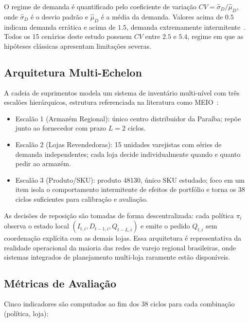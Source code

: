 \documentclass[a4paper,11pt]{article}
\begin{document}
O regime de demanda é quantificado pelo coeficiente de variação
$CV = \hat{\sigma}_D / \hat{\mu}_D$, onde $\hat{\sigma}_D$ é o
desvio padrão e $\hat{\mu}_D$ é a média da demanda. Valores acima
de \(0.5\) indicam demanda errática e acima de \(1.5\), demanda
extremamente intermitente~\citep{syntetos:2001}. Todos os 15
cenários deste estudo possuem $CV$ entre \(2.5\) e \(5.4\), regime
em que as hipóteses clássicas apresentam limitações severas.

\subsection{Arquitetura Multi-Echelon}

A cadeia de suprimentos modela um sistema de inventário multi-nível
com três escalões hierárquicos, estrutura referenciada na literatura
como MEIO~\citep{axsater:2006,clark:1960}:

\begin{itemize}
  \item Escalão 1 (Armazém Regional): único centro distribuidor da
    Paraíba; repõe junto ao fornecedor com prazo $L = 2$ ciclos.
  \item Escalão 2 (Lojas Revendedoras): 15 unidades varejistas com
    séries de demanda independentes; cada loja decide individualmente
    quando e quanto pedir ao armazém.
  \item Escalão 3 (Produto/SKU): produto 48130, único SKU estudado;
    foco em um item isola o comportamento intermitente de efeitos de
    portfólio e torna os 38 ciclos suficientes para calibração e
    avaliação.
\end{itemize}

As decisões de reposição são tomadas de forma descentralizada: cada
política $\pi_i$ observa o estado local $(I_{t,i}, D_{t-1,i},
Q_{t-L,i})$ e emite o pedido $Q_{t,i}$ sem coordenação explícita
com as demais lojas. Essa arquitetura é representativa da realidade
operacional da maioria das redes de varejo regional brasileiras, onde
sistemas integrados de planejamento multi-loja raramente estão
disponíveis.

\subsection{Métricas de Avaliação}

Cinco indicadores são computados ao fim dos 38 ciclos para cada
combinação (política, loja):
\end{document}
